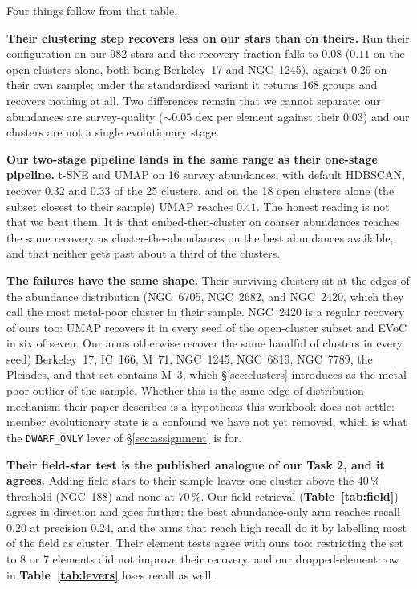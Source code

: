 Four things follow from that table.

\textbf{Their clustering step recovers less on our stars than on theirs.} Run
their configuration on our 982 stars and the recovery fraction falls to $0.08$
($0.11$ on the open clusters alone, both being Berkeley~17 and NGC~1245),
against $0.29$ on their own sample; under the standardised variant it returns
168 groups and recovers nothing at all. Two differences remain that we cannot
separate: our abundances are survey-quality ($\sim\!0.05$ dex per element
against their $0.03$) and our clusters are not a single evolutionary stage.

\textbf{Our two-stage pipeline lands in the same range as their one-stage
pipeline.} t-SNE and UMAP on 16 survey abundances, with default HDBSCAN,
recover $0.32$ and $0.33$ of the 25 clusters, and on the 18 open clusters alone
(the subset closest to their sample) UMAP reaches $0.41$. The honest reading is
not that we beat them. It is that embed-then-cluster on coarser abundances
reaches the same recovery as cluster-the-abundances on the best abundances
available, and that neither gets past about a third of the clusters.

\textbf{The failures have the same shape.} Their surviving clusters sit at the
edges of the abundance distribution (NGC~6705, NGC~2682, and NGC~2420, which
they call the most metal-poor cluster in their sample. NGC~2420 is a regular
recovery of ours too: UMAP recovers it in every seed of the open-cluster subset
and EVoC in six of seven. Our arms otherwise recover the same handful of
clusters in every seed) Berkeley~17, IC~166, M~71, NGC~1245, NGC~6819,
NGC~7789, the Pleiades, and that set contains M~3, which \S\ref{sec:clusters}
introduces as the metal-poor outlier of the sample. Whether this is the same
edge-of-distribution mechanism their paper describes is a hypothesis this
workbook does not settle: member evolutionary state is a confound we have not
yet removed, which is what the \texttt{DWARF\_ONLY} lever of
\S\ref{sec:assignment} is for.

\textbf{Their field-star test is the published analogue of our Task 2, and it
agrees.} Adding field stars to their sample leaves one cluster above the 40\,\%
threshold (NGC~188) and none at 70\,\%. Our field retrieval
(\textbf{Table~\ref{tab:field}}) agrees in direction and goes further: the best
abundance-only arm reaches recall $0.20$ at precision $0.24$, and the arms that
reach high recall do it by labelling most of the field as cluster. Their element
tests agree with ours too: restricting the set to 8 or 7 elements did not improve
their recovery, and our dropped-element row in \textbf{Table~\ref{tab:levers}}
loses recall as well.

